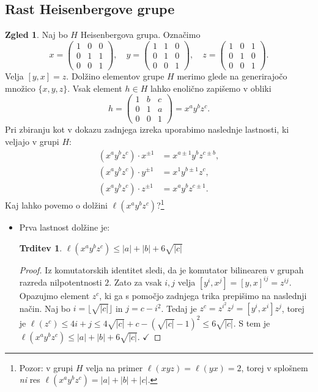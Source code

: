 \documentclass[11pt]{book}
\def\vprasanje{\color{oranzna}}
\def\kljuka{$\checkmark$}
\theoremstyle{definition}
\theoremstyle{zgled}
\newtheorem*{zgled}{Zgled}
\theoremstyle{odprtproblem}
\theoremstyle{domacanaloga}
\newenvironment{dokaz}
    {\color{siva}\begin{proof}}
    {\end{proof}}
\theoremstyle{izrek}
\newtheorem*{trditev}{Trditev}
\begin{document}
\subsection{Rast Heisenbergove grupe}

\begin{zgled}
Naj bo $H$ Heisenbergova grupa. Označimo
\[
x = 
\begin{pmatrix} 
1 & 0 & 0 \\
0 & 1 & 1 \\
0 & 0 & 1
\end{pmatrix}, \quad
y = 
\begin{pmatrix} 
1 & 1 & 0 \\
0 & 1 & 0 \\
0 & 0 & 1
\end{pmatrix}, \quad
z = 
\begin{pmatrix} 
1 & 0 & 1 \\
0 & 1 & 0 \\
0 & 0 & 1
\end{pmatrix}.
\]
Velja $[y,x] = z$. Dolžino elementov grupe $H$ merimo glede na generirajočo množico $\{ x, y, z \}$. Vsak element $h \in H$ lahko enolično zapišemo v obliki
\[
h = 
\begin{pmatrix} 
1 & b & c \\
0 & 1 & a \\
0 & 0 & 1
\end{pmatrix}
= x^a y^b z^c.
\]
Pri zbiranju kot v dokazu zadnjega izreka uporabimo naslednje lastnosti, ki veljajo v grupi $H$:
\begin{align*}
(x^a y^b z^c) \cdot x^{\pm 1} &= x^{a \pm 1} y^b z^{c \pm b}, \\
(x^a y^b z^c) \cdot y^{\pm 1} &= x^1 y^{b \pm 1} z^c, \\
(x^a y^b z^c) \cdot z^{\pm 1} &= x^a y^b z^{c \pm 1}.
\end{align*}
{\vprasanje Kaj lahko povemo o dolžini $\ell(x^a y^b z^c)$?}\footnote{Pozor: v grupi $H$ velja na primer $\ell(xyz) = \ell(yx) = 2$, torej v splošnem {\em ni} res $\ell(x^a y^b z^c) = |a| + |b| + |c|$.} 

\begin{itemize}
    \item Prva lastnost dolžine je:

\begin{trditev}
$\ell(x^a y^b z^c) \leq |a| + |b| + 6 \sqrt{|c|}$
\end{trditev}

\begin{dokaz}
Iz komutatorskih identitet sledi, da je komutator bilinearen v grupah razreda nilpotentnosti $2$. Zato za vsak $i,j$ velja $[y^i, x^j] = [y,x]^{ij} = z^{ij}$. Opazujmo element $z^c$, ki ga s pomočjo zadnjega trika prepišimo na naslednji način. Naj bo $i = \lfloor \sqrt{|c|} \rfloor$ in $j = c - i^2$. Tedaj je $z^c = z^{i^2} z^j = [y^i, x^i] z^j$, torej je $\ell(z^c) \leq 4 i + j \leq 4 \sqrt{|c|} + c - (\sqrt{|c|} - 1)^2 \leq 6 \sqrt{|c|}$. S tem je $\ell(x^a y^b z^c) \leq |a| + |b| + 6 \sqrt{|c|}$. \kljuka
\end{dokaz}



\end{itemize}
\end{zgled}
\end{document}
